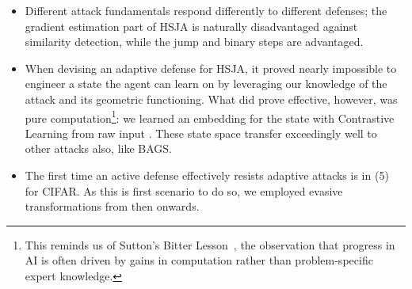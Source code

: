 \begin{itemize}[leftmargin=*]
    \item Different attack fundamentals respond differently to different defenses; the gradient estimation part of HSJA is naturally disadvantaged against similarity detection, while the jump and binary steps are advantaged.
    \item When devising an adaptive defense for HSJA, it proved nearly impossible to engineer a state the agent can learn on by leveraging our knowledge of the attack and its geometric functioning. What did prove effective, however, was pure computation\footnote{This reminds us of Sutton's Bitter Lesson~\cite{sutton2019bitter}, the observation that progress in AI is often driven by gains in computation rather than problem-specific expert knowledge.}: we learned an embedding for the state with Contrastive Learning from raw input \cite{hadsell2006dimensionality}. These state space transfer exceedingly well to other attacks also, like BAGS.
    \item The first time an active defense effectively resists adaptive attacks is in (5) for CIFAR. As this is first scenario to do so, we employed evasive transformations from then onwards.
\end{itemize}

